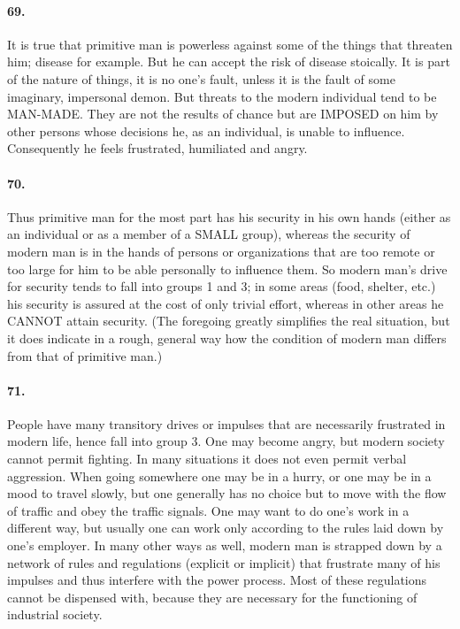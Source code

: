 \documentclass[12pt]{book}
\begin{document}
\paragraph{69.}  It is true that primitive man is powerless against some of the things that threaten him; disease for example. But he can accept the risk of disease stoically. It is part of the nature of things, it is no one's fault, unless it is the fault of some imaginary, impersonal demon. But threats to the modern individual tend to be MAN-MADE. They are not the results of chance but are IMPOSED on him by other persons whose decisions he, as an individual, is unable to influence. Consequently he feels frustrated, humiliated and angry.


\paragraph{70.}  Thus primitive man for the most part has his security in his own hands (either as an individual or as a member of a SMALL group), whereas the security of modern man is in the hands of persons or organizations that are too remote or too large for him to be able personally to influence them.  So modern man's drive for security tends to fall into groups 1 and 3; in some areas (food, shelter, etc.) his security is assured at the cost of only trivial effort, whereas in other areas he CANNOT attain security. (The foregoing greatly simplifies the real situation, but it does indicate in a rough, general way how the condition of modern man differs from that of primitive man.)


\paragraph{71.}  People have many transitory drives or impulses that are necessarily frustrated in modern life, hence fall into group 3. One may become angry, but modern society cannot permit fighting. In many situations it does not even permit verbal aggression. When going somewhere one may be in a hurry, or one may be in a mood to travel slowly, but one generally has no choice but to move with the flow of traffic and obey the traffic signals. One may want to do one's work in a different way, but usually one can work only according to the rules laid down by one's employer. In many other ways as well, modern man is strapped down by a network of rules and regulations (explicit or implicit) that frustrate many of his impulses and thus interfere with the power process. Most of these regulations cannot be dispensed with, because they are necessary for the functioning of industrial society.
\end{document}
